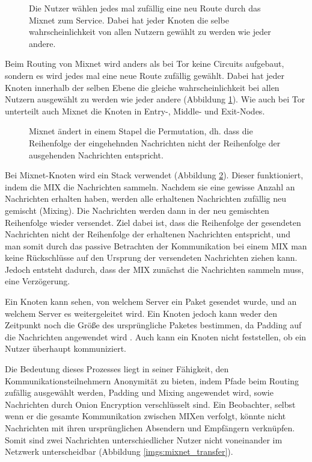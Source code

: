 \begin{figure}[h!]
    \centering
    
    \caption{Die Nutzer wählen jedes mal zufällig eine neu Route durch das Mixnet zum Service. Dabei hat jeder Knoten die selbe wahrscheinlichkeit von allen Nutzern gewählt zu werden wie jeder andere.}
    \label{imgs:mixnet}
\end{figure}

Beim Routing von Mixnet wird anders als bei Tor keine Circuits aufgebaut, sondern es wird jedes mal eine neue Route zufällig gewählt. Dabei hat jeder Knoten innerhalb der selben Ebene die gleiche wahrscheinlichkeit bei allen Nutzern ausgewählt zu werden wie jeder andere (Abbildung \ref{imgs:mixnet}). Wie auch bei Tor unterteilt auch Mixnet die Knoten in Entry-, Middle- und Exit-Nodes.

\begin{figure}[h!]
    \centering
    
    \caption{Mixnet ändert in einem Stapel die Permutation, dh. dass die Reihenfolge der eingehehnden Nachrichten nicht der Reihenfolge der ausgehenden Nachrichten entspricht.}
    \label{imgs:mixnet_stack}
\end{figure}

Bei Mixnet-Knoten wird ein Stack verwendet (Abbildung \ref{imgs:mixnet_stack}). Dieser funktioniert, indem die MIX die Nachrichten sammeln. Nachdem sie eine gewisse Anzahl an Nachrichten erhalten haben, werden alle erhaltenen Nachrichten zufällig neu gemischt (Mixing). Die Nachrichten werden dann in der neu gemischten Reihenfolge wieder versendet. Ziel dabei ist, dass die Reihenfolge der gesendeten Nachrichten nicht der Reihenfolge der erhaltenen Nachrichten entspricht, und man somit durch das passive Betrachten der Kommunikation bei einem MIX man keine Rückschlüsse auf den Ursprung der versendeten Nachrichten ziehen kann. Jedoch entsteht dadurch, dass der MIX zunächst die Nachrichten sammeln muss, eine Verzögerung.

Ein Knoten kann sehen, von welchem Server ein Paket gesendet wurde, und an welchem Server es weitergeleitet wird. Ein Knoten jedoch kann weder den Zeitpunkt noch die Größe des ursprüngliche Paketes bestimmen, da Padding auf die Nachrichten angewendet wird . Auch kann ein Knoten nicht feststellen, ob ein Nutzer überhaupt kommuniziert.

Die Bedeutung dieses Prozesses liegt in seiner Fähigkeit, den Kommunikationsteilnehmern Anonymität zu bieten, indem Pfade beim Routing zufällig ausgewählt werden, Padding und Mixing angewendet wird, sowie Nachrichten durch Onion Encryption verschlüsselt sind. Ein Beobachter, selbst wenn er die gesamte Kommunikation zwischen MIXen verfolgt, könnte nicht Nachrichten mit ihren ursprünglichen Absendern und Empfängern verknüpfen. Somit sind zwei Nachrichten unterschiedlicher Nutzer nicht voneinander im Netzwerk unterscheidbar (Abbildung \ref{imgs:mixnet_transfer}).

